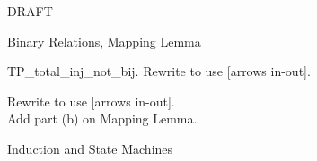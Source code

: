 \documentclass[quiz]{mcs}
\begin{document}


\examspace

\begin{center}
{\Large DRAFT}
\end{center}

\begin{center}
{\large Binary Relations, Mapping Lemma}
\end{center}


\begin{staffnotes}
TP\_total\_inj\_not\_bij.  Rewrite to use [arrows in-out].
\end{staffnotes}

{\color{red}
Rewrite to use [arrows in-out].\\
Add part (b) on Mapping Lemma.
}

%
%
%

\begin{center}
{\large Induction and State Machines}
\end{center}
\end{document}
